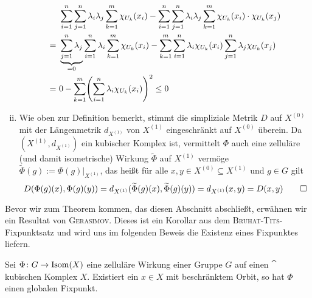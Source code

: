\begin{beweis}
\begin{enumerate}[(i)]
		\begin{equation}
		\begin{aligned}
		\ &\sum\limits_{i=1}^{n} \sum\limits_{j=1}^{n} \lambda_i \lambda_j \sum\limits_{k=1}^m \chi_{U_k} (x_i) - \sum\limits_{i=1}^{n} \sum\limits_{j=1}^{n} \lambda_i \lambda_j \sum\limits_{k=1}^m \chi_{U_k} (x_i) \cdot \chi_{U_k} (x_j) \\
		= \  &\underbrace{\sum\limits_{j=1}^{n} \lambda_j}_{=0} \sum\limits_{i=1}^{n} \lambda_i \sum\limits_{k=1}^m \chi_{U_k} (x_i) - \sum\limits_{k=1}^m \sum\limits_{i=1}^{n} \lambda_i \chi_{U_k}(x_i) \sum\limits_{j=1}^{n} \lambda_j \chi_{U_k} (x_j) \\
		= \ &0 - \sum\limits_{k=1}^m \enbrace*{\sum\limits_{i=1}^n \lambda_i \chi_{U_k} (x_i)}^2 
		\leq 0
		\end{aligned}
		\end{equation}
		\item Wie oben zur Definition bemerkt, stimmt die simpliziale Metrik $D$ auf $X^{(0)}$ mit der Längenmetrik $d_{X^{(1)}}$ von $X^{(1)}$ eingeschränkt auf $X^{(0)}$ überein. Da $(X^{(1)},d_{X^{(1)}})$ ein kubischer Komplex ist, vermittelt $\Phi$ auch eine zelluläre (und damit isometrische) Wirkung $\widetilde{\Phi}$ auf $X^{(1)}$ vermöge $\widetilde{\Phi}(g) := \Phi(g) \big|_{X^{(1)}}$, das heißt für alle $x,y \in X^{(0)} \subseteq X^{(1)}$ und $g \in G$ gilt
		\[ D(\Phi(g)(x),\Phi(g)(y)) = d_{X^{(1)}}(\widetilde{\Phi}(g)(x),\widetilde{\Phi}(g)(y)) = d_{X^{(1)}}(x,y) = D(x,y) \qedhere \]		
	\end{enumerate}
\end{beweis}

Bevor wir zum Theorem kommen, das diesen Abschnitt abschließt, erwähnen wir ein Resultat von \textsc{Gerasimov}. Dieses ist ein Korollar aus dem \textsc{Bruhat-Tits}-Fixpunktsatz und wird uns im folgenden Beweis die Existenz eines Fixpunktes liefern.

\begin{satz}
\label{satz:gerasimov}
	Sei $\Phi\colon G \rightarrow \operatorname{Isom}(X)$ eine zelluläre Wirkung einer Gruppe $G$ auf einen $\cat$ kubischen Komplex $X$. Existiert ein $x \in X$ mit beschränktem Orbit, so hat $\Phi$ einen globalen Fixpunkt.
\end{satz}

